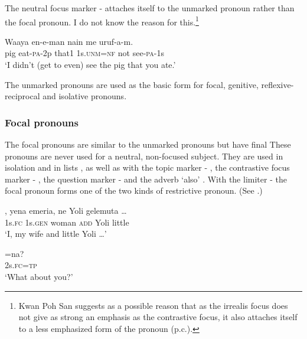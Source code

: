 The neutral focus marker - attaches itself to the unmarked pronoun rather than the focal pronoun. I do not know the reason for this.\footnote{Kwan Poh San suggests as a possible reason that as the irrealis focus does not give as strong an emphasis as the contrastive focus, it also attaches itself to a less emphasized form of the pronoun (p.c.).}

\ea%
\label{ex:3:x547}
\gll Waaya en-e-man nain  me uruf-a-m. \\
pig eat-\textsc{pa}-2p that1 1s.\textsc{unm}=\textsc{nf} not see-\textsc{pa}-1s \\
\glt`I didn't (get to even) see the pig that you ate.'
\z

The unmarked pronouns are used as the basic form for focal, genitive, reflexive-reciprocal and isolative pronouns.

\subsubsection{Focal pronouns}
{}
The focal pronouns are similar to the unmarked pronouns but have final  These pronouns are never used for a neutral, non-focused subject. They are used in isolation and in lists , as well as with the topic marker - , the contrastive focus marker - , the question marker -  and the adverb  `also' . With the limiter -  the focal pronoun forms one of the two kinds of restrictive pronoun. (See .)

\ea%
\label{ex:3:x541}
\gll {}, yena emeria, ne Yoli gelemuta {\dots} \\
1s.\textsc{fc} 1s.\textsc{gen} woman \textsc{add} Yoli little\\
\glt`I, my wife and little Yoli {\dots}'
\z

\ea%
\label{ex:3:x542}
\gll {}=na? \\
2s.\textsc{fc}=\textsc{tp}\\
\glt`What about you?'
\z

